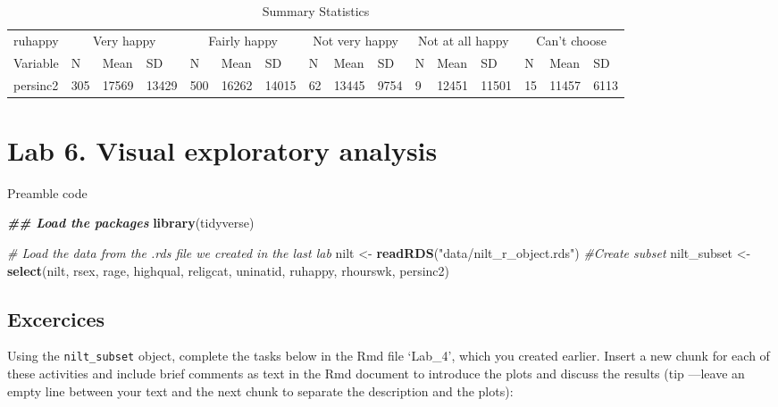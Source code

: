 \documentclass[
]{book}
\newenvironment{Shaded}{\begin{snugshade}}{\end{snugshade}}
\newcommand{\CommentTok}[1]{\textcolor[rgb]{0.56,0.35,0.01}{\textit{#1}}}
\newcommand{\DocumentationTok}[1]{\textcolor[rgb]{0.56,0.35,0.01}{\textbf{\textit{#1}}}}
\newcommand{\FunctionTok}[1]{\textcolor[rgb]{0.13,0.29,0.53}{\textbf{#1}}}
\newcommand{\NormalTok}[1]{#1}
\newcommand{\OtherTok}[1]{\textcolor[rgb]{0.56,0.35,0.01}{#1}}
\newcommand{\StringTok}[1]{\textcolor[rgb]{0.31,0.60,0.02}{#1}}
\begin{document}
\begin{table}

\caption{\label{tab:unnamed-chunk-124}Summary Statistics}
\centering
\begin{tabular}[t]{llllllllllllllll}
\toprule
\multicolumn{1}{c}{ruhappy} & \multicolumn{3}{c}{Very happy} & \multicolumn{3}{c}{Fairly happy} & \multicolumn{3}{c}{Not very happy} & \multicolumn{3}{c}{Not at all happy} & \multicolumn{3}{c}{Can't choose} \\
\cmidrule(l{3pt}r{3pt}){1-1} \cmidrule(l{3pt}r{3pt}){2-4} \cmidrule(l{3pt}r{3pt}){5-7} \cmidrule(l{3pt}r{3pt}){8-10} \cmidrule(l{3pt}r{3pt}){11-13} \cmidrule(l{3pt}r{3pt}){14-16}
Variable & N & Mean & SD & N & Mean & SD & N & Mean & SD & N & Mean & SD & N & Mean & SD\\
\midrule
persinc2 & 305 & 17569 & 13429 & 500 & 16262 & 14015 & 62 & 13445 & 9754 & 9 & 12451 & 11501 & 15 & 11457 & 6113\\
\bottomrule
\end{tabular}
\end{table}

\hypertarget{lab-6.-visual-exploratory-analysis}{%
\section{Lab 6. Visual exploratory analysis}\label{lab-6.-visual-exploratory-analysis}}

Preamble code

\begin{Shaded}
\begin{Highlighting}[]
\DocumentationTok{\#\# Load the packages}
\FunctionTok{library}\NormalTok{(tidyverse)}

\CommentTok{\# Load the data from the .rds file we created in the last lab}
\NormalTok{nilt }\OtherTok{\textless{}{-}} \FunctionTok{readRDS}\NormalTok{(}\StringTok{"data/nilt\_r\_object.rds"}\NormalTok{)}
\CommentTok{\#Create subset}
\NormalTok{nilt\_subset }\OtherTok{\textless{}{-}} \FunctionTok{select}\NormalTok{(nilt, rsex, rage, highqual, religcat, uninatid,  ruhappy, rhourswk, persinc2)}
\end{Highlighting}
\end{Shaded}

\hypertarget{excercices}{%
\subsection{Excercices}\label{excercices}}

Using the \texttt{nilt\_subset} object, complete the tasks below in the Rmd file `Lab\_4', which you created earlier. Insert a new chunk for each of these activities and include brief comments as text in the Rmd document to introduce the plots and discuss the results (tip ---leave an empty line between your text and the next chunk to separate the description and the plots):
\end{document}
